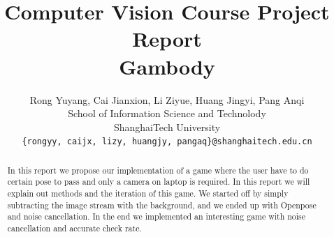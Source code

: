 \documentclass[11pt,twocolumn,letterpaper]{article}
\begin{document}
\title{
Computer Vision Course Project Report\\
Gambody
}

\author{Rong Yuyang, Cai Jianxion, Li Ziyue, Huang Jingyi, Pang Anqi\\
School of Information Science and Technolody\\
ShanghaiTech University\\
{\tt\small \{rongyy, caijx, lizy, huangjy, pangaq\}@shanghaitech.edu.cn}
}

\maketitle
\begin{abstract}
  In this report we propose our implementation of a game where the user have to do certain pose to pass and only a camera on laptop is required. 
  In this report we will explain out methods and the iteration of this game. 
  We started off by simply subtracting the image stream with the background, and we ended up with Openpose and noise cancellation.
  In the end we implemented an interesting game with noise cancellation and accurate check rate.
\end{abstract}
\end{document}
